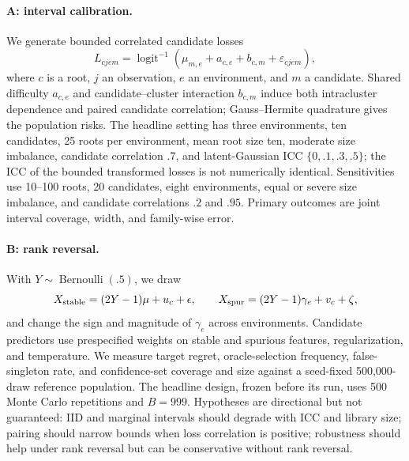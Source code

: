 \documentclass{article}
\begin{document}
\paragraph{A: interval calibration.}
We generate bounded correlated candidate losses
\begin{equation}
L_{cjem}=\operatorname{logit}^{-1}(\mu_{m,e}+a_{c,e}+b_{c,m}+\varepsilon_{cjem}),
\label{eq:simloss}
\end{equation}
where $c$ is a root, $j$ an observation, $e$ an environment, and $m$ a candidate.  Shared difficulty $a_{c,e}$ and candidate--cluster interaction $b_{c,m}$ induce both intracluster dependence and paired candidate correlation; Gauss--Hermite quadrature gives the population risks.  The headline setting has three environments, ten candidates, 25 roots per environment, mean root size ten, moderate size imbalance, candidate correlation $.7$, and latent-Gaussian ICC $\{0,.1,.3,.5\}$; the ICC of the bounded transformed losses is not numerically identical.  Sensitivities use 10--100 roots, 20 candidates, eight environments, equal or severe size imbalance, and candidate correlations $.2$ and $.95$.  Primary outcomes are joint interval coverage, width, and family-wise error.

\paragraph{B: rank reversal.}
With $Y\sim\operatorname{Bernoulli}(.5)$, we draw
\begin{equation}
X_{\rm stable}=(2Y-1)\mu+u_c+\epsilon,\qquad
X_{\rm spur}=(2Y-1)\gamma_e+v_c+\zeta,
\label{eq:ranksim}
\end{equation}
and change the sign and magnitude of $\gamma_e$ across environments.  Candidate predictors use prespecified weights on stable and spurious features, regularization, and temperature.  We measure target regret, oracle-selection frequency, false-singleton rate, and confidence-set coverage and size against a seed-fixed 500,000-draw reference population.  The headline design, frozen before its run, uses 500 Monte Carlo repetitions and $B=999$.  Hypotheses are directional but not guaranteed: IID and marginal intervals should degrade with ICC and library size; pairing should narrow bounds when loss correlation is positive; robustness should help under rank reversal but can be conservative without rank reversal.
\end{document}
